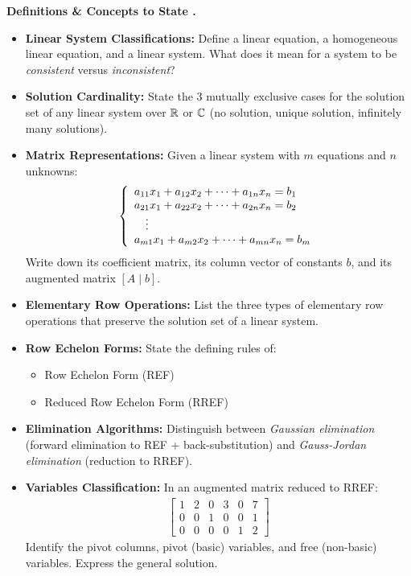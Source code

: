 \documentclass{natsirt}
\newcounter{topic}[section]
\newenvironment{recallbox}[1][]{%
    \begin{bluebox}[#1]\refstepcounter{topic}\textbf{Definitions \& Concepts to State \thesection.\thetopic}%
}{\end{bluebox}}
\newcommand{\citem}{\item[$\square$]}
\begin{document}
\begin{recallbox}
    \begin{itemize}
        \citem \textbf{Linear System Classifications:} Define a linear equation, a homogeneous linear equation, and a linear system. What does it mean for a system to be \emph{consistent} versus \emph{inconsistent}?
        \citem \textbf{Solution Cardinality:} State the 3 mutually exclusive cases for the solution set of any linear system over $\mathbb{R}$ or $\mathbb{C}$ (no solution, unique solution, infinitely many solutions).
        \citem \textbf{Matrix Representations:} Given a linear system with $m$ equations and $n$ unknowns:
        \begin{align*}
            \left\{ \begin{array}{ll}
                a_{11}x_1 + a_{12}x_2 + \dots + a_{1n}x_n = b_1 \\
                a_{21}x_1 + a_{22}x_2 + \dots + a_{2n}x_n = b_2 \\
                \quad\vdots \\
                a_{m1}x_1 + a_{m2}x_2 + \dots + a_{mn}x_n = b_m
            \end{array}\right.
        \end{align*}
        Write down its coefficient matrix, its column vector of constants $b$, and its augmented matrix $[A \mid b]$.
        \citem \textbf{Elementary Row Operations:} List the three types of elementary row operations that preserve the solution set of a linear system.
        \citem \textbf{Row Echelon Forms:} State the defining rules of:
        \begin{itemize}
            \item Row Echelon Form (REF)
            \item Reduced Row Echelon Form (RREF)
        \end{itemize}
        \citem \textbf{Elimination Algorithms:} Distinguish between \emph{Gaussian elimination} (forward elimination to REF + back-substitution) and \emph{Gauss-Jordan elimination} (reduction to RREF).
        \citem \textbf{Variables Classification:} In an augmented matrix reduced to RREF:
        \begin{align*}
            \begin{bmatrix}
                1 & 2 & 0 & 3 & 0 & 7 \\
                0 & 0 & 1 & 0 & 0 & 1 \\
                0 & 0 & 0 & 0 & 1 & 2
            \end{bmatrix}
        \end{align*}
        Identify the pivot columns, pivot (basic) variables, and free (non-basic) variables. Express the general solution.

\end{itemize}
\end{recallbox}
\end{document}
